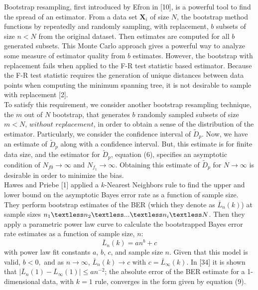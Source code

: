 \documentclass{article}
\begin{document}
	\indent Bootstrap resampling, first introduced by Efron in [10], is a powerful tool to find the spread of an estimator. From a data set $\textbf{X}_i$ of size $N$, the bootstrap method functions by repeatedly and randomly sampling, with replacement, $b$ subsets of size $n<N$ from the original dataset. Then estimates are computed for all $b$ generated subsets. This Monte Carlo approach gives a powerful way to analyze some measure of estimator quality from $b$ estimates. However, the bootstrap with replacement fails when applied to the F-R test statistic based estimator. Because the F-R test statistic requires the generation of unique distances between data points when computing the minimum spanning tree, it is not desirable to sample with replacement [2]. 
	\\ [0.5ex]
	
	\indent To satisfy this requirement, we consider another bootstrap resampling technique, the $m$ out of $N$ bootstrap, that generates $b$ randomly sampled subsets of size $m<N$, $without$ $replacement$, in order to obtain a sense of the distribution of the estimator. Particularly, we consider the confidence interval of $\widetilde{D}_p$. Now, we have an estimate of $\widetilde{D}_p$ along with a confidence interval. But, this estimate is for finite data size, and the estimator for $\widetilde{D}_p$, equation (6), specifies an asymptotic condition of $N_{f0} \rightarrow \infty$ and $N_{f_1} \rightarrow \infty$. Obtaining this estimate of $\widetilde{D}_p$ for $N \rightarrow \infty$ is desirable in order to minimize the bias. 
	\\ [0.5ex]
	
	\indent Hawes and Priebe [1] applied a $k$-Nearest Neighbors rule to find the upper and lower bound on the asymptotic Bayes error rate as a function of sample size. They perform bootstrap estimates of the BER (which they denote as $\bar{L}_n(k)$) at sample sizes $n_1 \textless n_2 \textless ... \textless n_i \textless N$. Then they apply a parametric power law curve to calculate the bootstrapped Bayes error rate estimates as a function of sample size, $n$:
		\begin{equation}
		\bar{L}_n(k)=an^b+c
		\end{equation}
	with power law fit constants $a$, $b$, $c$, and sample size $n$. Given that this model is valid, $b<0,$ and as $n \rightarrow \infty$, $\bar{L}_n(k)\rightarrow c$ with $c=\bar{L}_\infty(k)$. In [34] it is shown that $\vert \bar{L}_n(1)-\bar{L}_\infty (1) \vert \leq an^{-2}$; the absolute error of the BER estimate for a 1-dimensional data, with $k=1$ rule, converges in the form given by equation (9). 
	\\[0.5ex]
	
\end{document}
